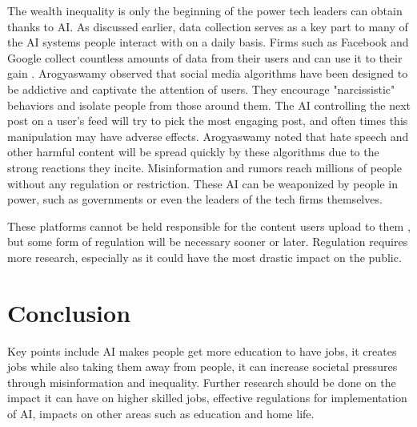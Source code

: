 \documentclass[12pt, man]{apa6}
\begin{document}
The wealth inequality is only the beginning of the power tech leaders can obtain thanks to AI.  As discussed earlier, data collection serves as a key part to many of the AI systems people interact with on a daily basis.  Firms such as Facebook and Google collect countless amounts of data from their users and can use it to their gain \parencite{Arogyaswamy2020}.  Arogyaswamy \parencite*{Arogyaswamy2020} observed that social media algorithms have been designed to be addictive and captivate the attention of users.  They encourage "narcissistic" behaviors and isolate people from those around them.  The AI controlling the next post on a user's feed will try to pick the most engaging post, and often times this manipulation may have adverse effects.  Arogyaswamy \parencite*{Arogyaswamy2020} noted that hate speech and other harmful content will be spread quickly by these algorithms due to the strong reactions they incite.  Misinformation and rumors reach millions of people without any regulation or restriction.  These AI can be weaponized by people in power, such as governments or even the leaders of the tech firms themselves.

These platforms cannot be held responsible for the content users upload to them \parencite{Arogyaswamy2020}, but some form of regulation will be necessary sooner or later.  Regulation requires more research, especially as it could have the most drastic impact on the public.

\section{Conclusion}
Key points include AI makes people get more education to have jobs, it creates jobs while also taking them away from people, it can increase societal pressures through misinformation and inequality.  Further research should be done on the impact it can have on higher skilled jobs, effective regulations for implementation of AI, impacts on other areas such as education and home life.








\printbibliography
\end{document}
